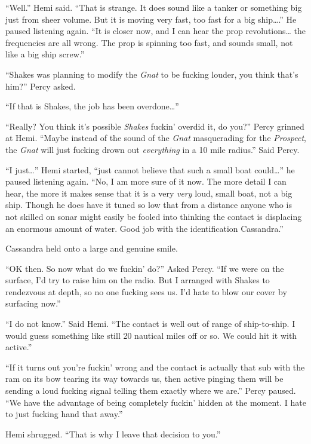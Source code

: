\documentclass[]{scrbook}
\begin{document}
``Well.'' Hemi said. ``That is strange. It does sound like a tanker or
something big just from sheer volume. But it is moving very fast, too
fast for a big ship\ldots{}.'' He paused listening again. ``It is closer
now, and I can hear the prop revolutions\ldots{} the frequencies are all
wrong. The prop is spinning too fast, and sounds small, not like a big
ship screw.''

``Shakes was planning to modify the \emph{Gnat} to be fucking louder,
you think that's him?'' Percy asked.

``If that is Shakes, the job has been overdone\ldots{}''

``Really? You think it's possible \emph{Shakes} fuckin' overdid it, do
you?'' Percy grinned at Hemi. ``Maybe instead of the sound of the
\emph{Gnat} masquerading for the \emph{Prospect}, the \emph{Gnat} will
just fucking drown out \emph{everything} in a 10 mile radius.'' Said
Percy.

``I just\ldots{}'' Hemi started, ``just cannot believe that such a small
boat could\ldots{}'' he paused listening again. ``No, I am more sure of
it now. The more detail I can hear, the more it makes sense that it is a
very \emph{very} loud, small boat, not a big ship. Though he does have
it tuned so low that from a distance anyone who is not skilled on sonar
might easily be fooled into thinking the contact is displacing an
enormous amount of water. Good job with the identification Cassandra.''

Cassandra held onto a large and genuine smile.

``OK then. So now what do we fuckin' do?'' Asked Percy. ``If we were on
the surface, I'd try to raise him on the radio. But I arranged with
Shakes to rendezvous at depth, so no one fucking sees us. I'd hate to
blow our cover by surfacing now.''

``I do not know.'' Said Hemi. ``The contact is well out of range of
ship-to-ship. I would guess something like still 20 nautical miles off
or so. We could hit it with active.''

``If it turns out you're fuckin' wrong and the contact is actually that
sub with the ram on its bow tearing its way towards us, then active
pinging them will be sending a loud fucking signal telling them exactly
where we are.'' Percy paused. ``We have the advantage of being
completely fuckin' hidden at the moment. I hate to just fucking hand
that away.''

Hemi shrugged. ``That is why I leave that decision to you.''
\end{document}
